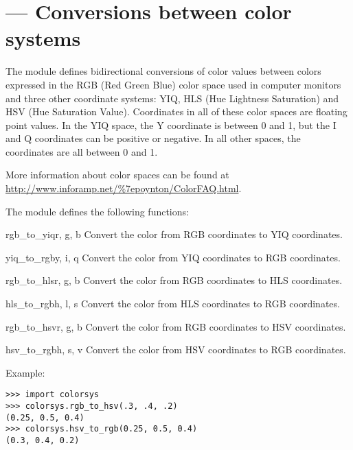 \section{ ---
         Conversions between color systems}


The  module defines bidirectional conversions of
color values between colors expressed in the RGB (Red Green Blue)
color space used in computer monitors and three other coordinate
systems: YIQ, HLS (Hue Lightness Saturation) and HSV (Hue Saturation
Value).  Coordinates in all of these color spaces are floating point
values.  In the YIQ space, the Y coordinate is between 0 and 1, but
the I and Q coordinates can be positive or negative.  In all other
spaces, the coordinates are all between 0 and 1.

More information about color spaces can be found at 
\url{http://www.inforamp.net/\%7epoynton/ColorFAQ.html}.

The  module defines the following functions:

\begin{funcdesc}{rgb_to_yiq}{r, g, b}
Convert the color from RGB coordinates to YIQ coordinates.
\end{funcdesc}

\begin{funcdesc}{yiq_to_rgb}{y, i, q}
Convert the color from YIQ coordinates to RGB coordinates.
\end{funcdesc}

\begin{funcdesc}{rgb_to_hls}{r, g, b}
Convert the color from RGB coordinates to HLS coordinates.
\end{funcdesc}

\begin{funcdesc}{hls_to_rgb}{h, l, s}
Convert the color from HLS coordinates to RGB coordinates.
\end{funcdesc}

\begin{funcdesc}{rgb_to_hsv}{r, g, b}
Convert the color from RGB coordinates to HSV coordinates.
\end{funcdesc}

\begin{funcdesc}{hsv_to_rgb}{h, s, v}
Convert the color from HSV coordinates to RGB coordinates.
\end{funcdesc}

Example:

\begin{verbatim}
>>> import colorsys
>>> colorsys.rgb_to_hsv(.3, .4, .2)
(0.25, 0.5, 0.4)
>>> colorsys.hsv_to_rgb(0.25, 0.5, 0.4)
(0.3, 0.4, 0.2)
\end{verbatim}
